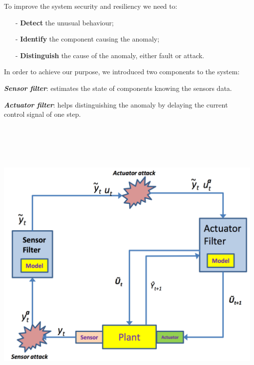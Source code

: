\documentclass{tikzposter}
\begin{document}
	{
		\begin{minipage}[t]{\linewidth}
			\centering
			\vspace{-100mm}
			\begin{minipage}[t]{0.45\textwidth}
				To improve the system security and resiliency we need to:

				\vspace{5mm}

				\begin{itemize}
					\item[-]{\textbf{Detect} the unusual behaviour;}
					\item[-]{\textbf{Identify} the component causing the anomaly;}
					\item[-]{\textbf{Distinguish} the cause of the anomaly, either fault or attack.}
				\end{itemize}
				In order to achieve our purpose, we introduced two components to the
				system:
				
				\vspace{5mm}

				\textit{\textbf{Sensor filter}}: estimates the state of
				components knowing the sensors data.

				\textit{\textbf{Actuator filter}}: helps distinguishing the
				anomaly by delaying the current control signal of one step.

			\end{minipage}
			\vspace{50mm}
			\begin{minipage}[c]{0.43\textwidth}
				\centering
				\vspace{100mm}
				\includegraphics[height=15cm]{./Images/system_architecture.pdf}
			\end{minipage}


\end{minipage}}
\end{document}
